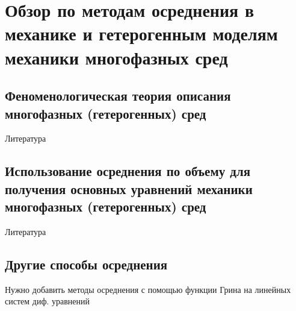 \section{Обзор по методам осреднения в механике и гетерогенным моделям механики многофазных сред} \label{section_1_2}

\subsection{Феноменологическая теория описания многофазных (гетерогенных) сред}
\label{section_1_2_1}

Литература \cite{Rakhmatulin, Nigm1}

\subsection{Использование осреднения по объему для получения основных уравнений механики многофазных (гетерогенных) сред}
\label{section_1_2_2}
Литература \cite{Nigm1, Nigm_Course, Nikoloaevskii, Nikoloaevskii2, Whitaker}


\subsection{Другие способы осреднения}
\label{section_1_2_3}

Нужно добавить методы осреднения с помощью функции Грина на линейных систем диф. уравнений